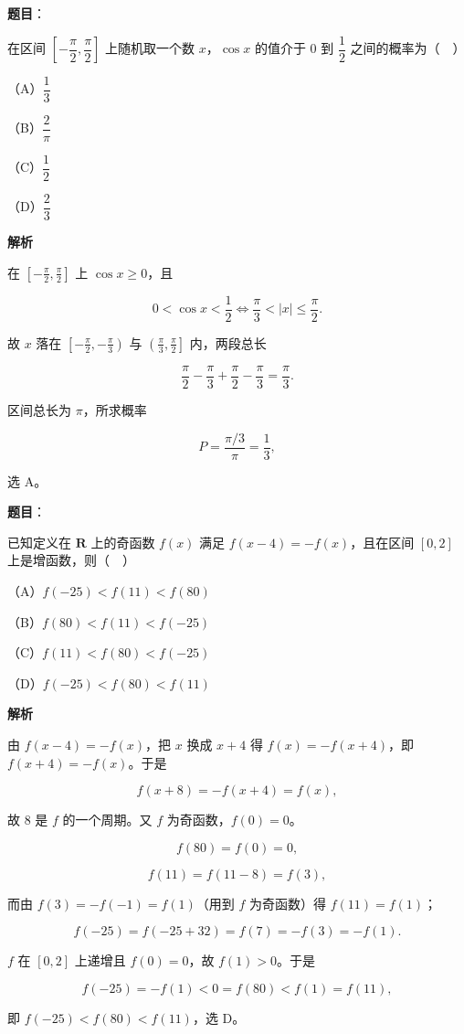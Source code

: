 \begin{answer}

\textbf{题目}：

在区间 $\left[-\dfrac{\pi}{2},\dfrac{\pi}{2}\right]$ 上随机取一个数 $x$，$\cos x$ 的值介于 $0$ 到 $\dfrac12$ 之间的概率为（　）

（A）$\dfrac13$

（B）$\dfrac2\pi$

（C）$\dfrac12$

（D）$\dfrac23$

\textbf{解析}

在 $\left[-\frac\pi2,\frac\pi2\right]$ 上 $\cos x\geqslant0$，且

\nopagebreak[4]
\[0<\cos x<\frac12\iff \frac\pi3<|x|\leqslant\frac\pi2 .\]

故 $x$ 落在 $\left[-\frac\pi2,-\frac\pi3\right)$ 与 $\left(\frac\pi3,\frac\pi2\right]$ 内，两段总长

\nopagebreak[4]
\[\frac\pi2-\frac\pi3+\frac\pi2-\frac\pi3=\frac\pi3 .\]

区间总长为 $\pi$，所求概率

\nopagebreak[4]
\[P=\frac{\pi/3}{\pi}=\frac13,\]

选 A。


\end{answer}
\begin{answer}

\textbf{题目}：

已知定义在 $\mathbf R$ 上的奇函数 $f(x)$ 满足 $f(x-4)=-f(x)$，且在区间 $[0,2]$ 上是增函数，则（　）

（A）$f(-25)<f(11)<f(80)$

（B）$f(80)<f(11)<f(-25)$

（C）$f(11)<f(80)<f(-25)$

（D）$f(-25)<f(80)<f(11)$

\textbf{解析}

由 $f(x-4)=-f(x)$，把 $x$ 换成 $x+4$ 得 $f(x)=-f(x+4)$，即 $f(x+4)=-f(x)$。于是

\nopagebreak[4]
\[f(x+8)=-f(x+4)=f(x),\]

故 $8$ 是 $f$ 的一个周期。又 $f$ 为奇函数，$f(0)=0$。

\nopagebreak[4]
\[f(80)=f(0)=0,\]

\nopagebreak[4]
\[f(11)=f(11-8)=f(3),\]

而由 $f(3)=-f(-1)=f(1)$（用到 $f$ 为奇函数）得 $f(11)=f(1)$；

\nopagebreak[4]
\[f(-25)=f(-25+32)=f(7)=-f(3)=-f(1).\]

$f$ 在 $[0,2]$ 上递增且 $f(0)=0$，故 $f(1)>0$。于是

\nopagebreak[4]
\[f(-25)=-f(1)<0=f(80)<f(1)=f(11),\]

即 $f(-25)<f(80)<f(11)$，选 D。


\end{answer}
